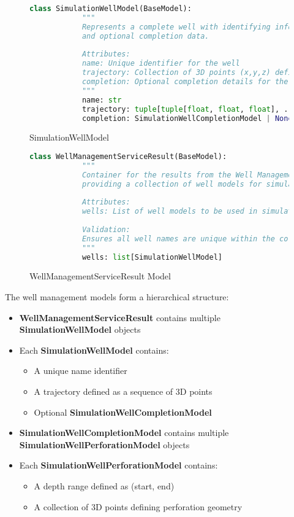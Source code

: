 \begin{enumerate}
	\begin{figure}[H]
		\begin{lstlisting}[language=Python]
			class SimulationWellModel(BaseModel):
			"""
			Represents a complete well with identifying information, trajectory,
			and optional completion data.
			
			Attributes:
			name: Unique identifier for the well
			trajectory: Collection of 3D points (x,y,z) defining the well path
			completion: Optional completion details for the well
			"""
			name: str
			trajectory: tuple[tuple[float, float, float], ...]
			completion: SimulationWellCompletionModel | None = Field(default=None)
		\end{lstlisting}
		\caption{SimulationWellModel}
	\end{figure}
	
	\begin{figure}[H]
		\begin{lstlisting}[language=Python]
			class WellManagementServiceResult(BaseModel):
			"""
			Container for the results from the Well Management Service,
			providing a collection of well models for simulation.
			
			Attributes:
			wells: List of well models to be used in simulation
			
			Validation:
			Ensures all well names are unique within the collection
			"""
			wells: list[SimulationWellModel]
		\end{lstlisting}
		\caption{WellManagementServiceResult Model}
	\end{figure}

	The well management models form a hierarchical structure:
	
	\begin{itemize}
		\item \textbf{WellManagementServiceResult} contains multiple \textbf{SimulationWellModel} objects
		\item Each \textbf{SimulationWellModel} contains:
		\begin{itemize}
			\item A unique name identifier
			\item A trajectory defined as a sequence of 3D points
			\item Optional \textbf{SimulationWellCompletionModel}
		\end{itemize}
		\item \textbf{SimulationWellCompletionModel} contains multiple \textbf{SimulationWellPerforationModel} objects
		\item Each \textbf{SimulationWellPerforationModel} contains:
		\begin{itemize}
			\item A depth range defined as (start, end)
			\item A collection of 3D points defining perforation geometry
		\end{itemize}
	\end{itemize}
\end{enumerate}

